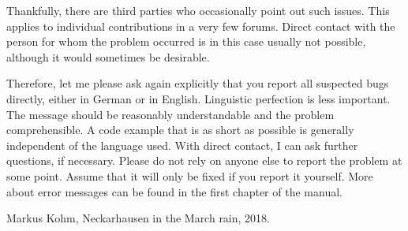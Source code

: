 Thankfully, there are third parties who occasionally point out such issues.
This applies to individual contributions in a very few forums. Direct contact
with the person for whom the problem occurred is in this case usually not
possible, although it would sometimes be desirable.

Therefore, let me please ask again explicitly that you report all suspected
bugs directly, either in German or in English. Linguistic perfection is less
important. The message should be reasonably understandable and the problem
comprehensible. A code example that is as short as possible is generally
independent of the language used. With direct contact, I can ask further
questions, if necessary. Please do not rely on anyone else to report the
problem at some point. Assume that it will only be fixed if you report it
yourself. More about error messages can be found in the first chapter of the
manual.

\bigskip\noindent
Markus Kohm, Neckarhausen in the March rain, 2018.

\endinput


